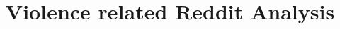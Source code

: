 \documentclass[final,1p,times,authoryear]{elsarticle}
\begin{document}
\begin{frontmatter}



\title{Violence related Reddit Analysis} %








\end{frontmatter}
\end{document}
